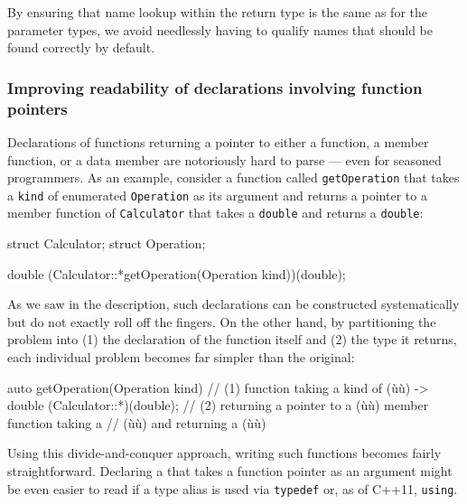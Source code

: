\noindent By ensuring that name lookup within the return type is the same as for
the parameter types, we avoid needlessly having to qualify names that
should be found correctly by default.

\subsubsection[Improving readability of declarations involving function pointers]{Improving readability of declarations involving function pointers}\label{improving-readability-of-declarations-involving-function-pointers}

Declarations of functions returning a pointer to either a function, a member function, or a data member are notoriously hard to parse --- even for seasoned programmers. As an example, consider a function called
\lstinline!getOperation! that takes a \lstinline!kind! of
enumerated \lstinline!Operation! as its argument and returns a pointer to a member
function of \lstinline!Calculator! that takes a \lstinline!double! and
returns a \lstinline!double!:

\begin{emcppshiddenlisting}[emcppsbatch=e3]
struct Calculator;
struct Operation;
\end{emcppshiddenlisting}
\begin{emcppslisting}[emcppsbatch=e3]
double (Calculator::*getOperation(Operation kind))(double);
\end{emcppslisting}

\noindent As we saw in the description, such declarations can be constructed
systematically but do not exactly roll off the fingers. On the other
hand, by partitioning the problem into (1) the declaration of the
function itself and (2) the type it returns, each individual problem
becomes far simpler than the original:

\begin{emcppslisting}[emcppsbatch=e3]
auto getOperation(Operation kind)  // (1) function taking a kind of (ù{}ù)
    -> double (Calculator::*)(double);
        // (2) returning a pointer to a (ù{}ù) member function taking a
        //     (ù{}ù) and returning a (ù{}ù)
\end{emcppslisting}

\noindent Using this divide-and-conquer approach, writing such functions becomes fairly straightforward. Declaring a  that
takes a function pointer as an argument might be even easier to read
if a type alias is used via \lstinline!typedef! or, as of C++11,
  \lstinline!using!.


